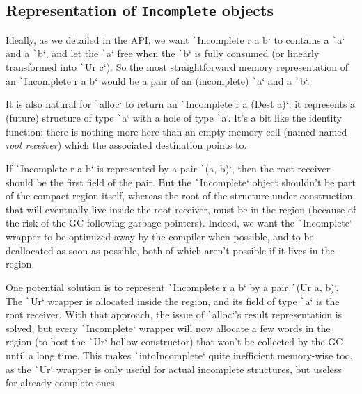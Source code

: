 \documentclass[english]{jflart}
\begin{document}
\subsection{Representation of \texttt{Incomplete} objects}

Ideally, as we detailed in the API, we want \texttt`Incomplete r a b` to contains a \texttt`a` and a \texttt`b`, and let the \texttt`a` free when the \texttt`b` is fully consumed (or linearly transformed into \texttt`Ur c`). So the most straightforward memory representation of an \texttt`Incomplete r a b` would be a pair of an (incomplete) \texttt`a` and a \texttt`b`.

It is also natural for \texttt`alloc` to return an \texttt`Incomplete r a (Dest a)`: it represents a (future) structure of type \texttt`a` with a hole of type \texttt`a`. It's a bit like the identity function: there is nothing more here than an empty memory cell (named named \emph{root receiver}) which the associated destination points to.


If \texttt`Incomplete r a b` is represented by a pair \texttt`(a, b)`, then the root receiver should be the first field of the pair. But the \texttt`Incomplete` object shouldn't be part of the compact region itself, whereas the root of the structure under construction, that will eventually live inside the root receiver, must be in the region (because of the risk of the GC following garbage pointers). Indeed, we want the \texttt`Incomplete` wrapper to be optimized away by the compiler when possible, and to be deallocated as soon as possible, both of which aren't possible if it lives in the region.

One potential solution is to represent \texttt`Incomplete r a b` by a pair \texttt`(Ur a, b)`. The \texttt`Ur` wrapper is allocated inside the region, and its field of type \texttt`a` is the root receiver. With that approach, the issue of \texttt`alloc`'s result representation is solved, but every \texttt`Incomplete` wrapper will now allocate a few words in the region (to host the \texttt`Ur` hollow constructor) that won't be collected by the GC until a long time. This makes \texttt`intoIncomplete` quite inefficient memory-wise too, as the \texttt`Ur` wrapper is only useful for actual incomplete structures, but useless for already complete ones.
\end{document}
